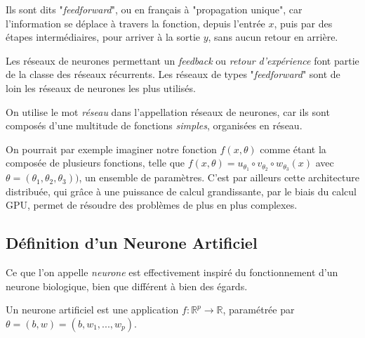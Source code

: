 \documentclass[a4paper, 11pt]{report}
\begin{document}
Ils sont dits "\emph{feedforward}", ou en français à "propagation unique", car l'information se déplace à travers la fonction, depuis l'entrée $x$, puis par des étapes intermédiaires, pour arriver à la sortie $y$, sans aucun retour en arrière.

Les réseaux de neurones permettant un \emph{feedback} ou \emph{retour d'expérience} font partie de la classe des réseaux récurrents.
Les réseaux de types "\emph{feedforward}" sont de loin les réseaux de neurones les plus utilisés.

On utilise le mot \emph{réseau} dans l’appellation réseaux de neurones, car ils sont composés d'une multitude de fonctions \emph{simples}, organisées en réseau.

On pourrait par exemple imaginer notre fonction $f(x,\theta)$ comme étant la composée de plusieurs fonctions, telle que $f(x,\theta) = u_{\theta_1} \circ v_{\theta_2} \circ w_{\theta_3}(x)$ avec $\theta = (\theta_1,\theta_2, \theta_3))$, un ensemble de paramètres.
C'est par ailleurs cette architecture distribuée, qui grâce à une puissance de calcul grandissante, par le biais du calcul GPU, permet de résoudre des problèmes de plus en plus complexes.
\subsection{Définition d'un Neurone Artificiel}
Ce que l'on appelle \emph{neurone} est effectivement inspiré du fonctionnement d'un neurone biologique, bien que différent à bien des égards.

Un neurone artificiel est une application $f : \mathbb{R}^p \rightarrow \mathbb{R}$, paramétrée par $\theta = (b,w) = (b, w_1, ..., w_p)$.
\end{document}
